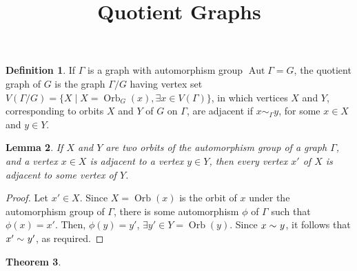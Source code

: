 \documentclass[12pt,a4paper]{amsart}
\title{Quotient Graphs}
\date{}
\newtheorem{Theorem}{Theorem}[section]
\newtheorem{Lemma}[Theorem]{Lemma}
\theoremstyle{remark}
\theoremstyle{definition}
\newtheorem{Definition}[Theorem]{Definition}
\newcommand{\adj}[1]{\sim_{\scriptscriptstyle #1}}
\DeclareMathOperator{\aut}{Aut}
\DeclareMathOperator{\orb}{Orb}
\begin{document}
\maketitle

\begin{Definition}
If $\Gamma$ is a graph with automorphism group $\aut \Gamma = G$, the quotient graph of $G$ is the graph $\Gamma/G$ having vertex set $V(\Gamma/G) = \{X \mid X = \orb_G(x), \exists x \in V(\Gamma)\}$, in which vertices $X$ and $Y$, corresponding to orbits $X$ and $Y$ of $G$ on $\Gamma$, are adjacent if $x \adj{\Gamma} y$, for some $x \in X$ and $y \in Y$.
\end{Definition}

\begin{Lemma}
\label{lem:xy=>x'y'}
If $X$ and $Y$ are two orbits of the automorphism group of a graph $\Gamma$, and a vertex $x \in X$ is adjacent to a vertex $y \in Y$, then every vertex $x'$ of $X$ is adjacent to some vertex of $Y$.
\end{Lemma}

\begin{proof}
Let $x' \in X$. Since $X = \orb(x)$ is the orbit of $x$ under the automorphism group of $\Gamma$, there is some automorphism $\phi$ of $\Gamma$ such that $\phi(x) = x'$. Then, $\phi(y) = y'$, $\exists y' \in Y = \orb(y)$. Since $x \adj{} y$, it follows that $x' \adj{} y'$, as required.
\end{proof}

\begin{Theorem}

\end{Theorem}
\end{document}
